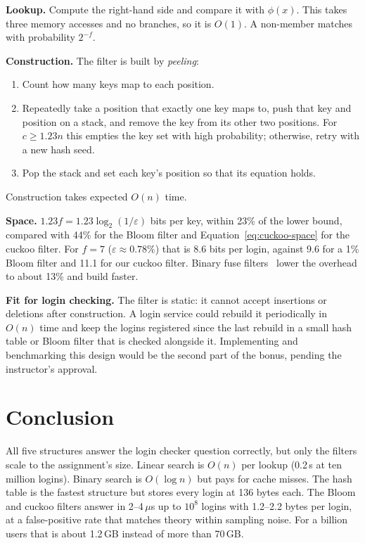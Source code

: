 \documentclass[acmsmall,nonacm]{acmart}
\newcommand{\us}{\,$\mu$s}
\begin{document}
\textbf{Lookup.} Compute the right-hand side and compare it with $\phi(x)$.
This takes three memory accesses and no branches, so it is $O(1)$. A non-member
matches with probability $2^{-f}$.

\textbf{Construction.} The filter is built by \emph{peeling}:
\begin{enumerate}
  \item Count how many keys map to each position.
  \item Repeatedly take a position that exactly one key maps to, push that key and position on a stack, and remove the key from its other two positions. For $c \ge 1.23n$ this empties the key set with high probability; otherwise, retry with a new hash seed.
  \item Pop the stack and set each key's position so that its equation holds.
\end{enumerate}
Construction takes expected $O(n)$ time.

\textbf{Space.} $1.23 f = 1.23 \log_2(1/\varepsilon)$ bits per key, within 23\%
of the lower bound, compared with 44\% for the Bloom filter and
Equation~\eqref{eq:cuckoo-space} for the cuckoo filter. For $f = 7$
($\varepsilon \approx 0.78\%$) that is 8.6 bits per login, against 9.6 for a 1\%
Bloom filter and 11.1 for our cuckoo filter. Binary fuse filters~\cite{graf2022}
lower the overhead to about 13\% and build faster.

\textbf{Fit for login checking.} The filter is static: it cannot accept
insertions or deletions after construction. A login service could rebuild it
periodically in $O(n)$ time and keep the logins registered since the last
rebuild in a small hash table or Bloom filter that is checked alongside it.
Implementing and benchmarking this design would be the second part of the
bonus, pending the instructor's approval.

\section{Conclusion}

All five structures answer the login checker question correctly, but only the
filters scale to the assignment's size. Linear search is $O(n)$ per lookup (0.2\,s
at ten million logins). Binary search is $O(\log n)$ but pays for cache misses.
The hash table is the fastest structure but stores every login at 136 bytes
each. The Bloom and cuckoo filters answer in 2--4\us{} up to $10^8$ logins
with 1.2--2.2 bytes per login, at a false-positive rate that matches theory
within sampling noise. For a billion users that is about 1.2\,GB instead of
more than 70\,GB.
\end{document}

